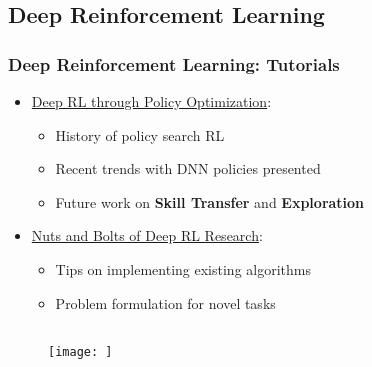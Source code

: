 \documentclass[11pt,
               hyperref={colorlinks,citecolor=pink,linkcolor=red,urlcolor=blue}
               ]{beamer}
\begin{document}
  \subsection{Deep Reinforcement Learning}

  \begin{frame}
    \frametitle{Deep Reinforcement Learning: Tutorials}

    \begin{itemize}
      \item \href{http://people.eecs.berkeley.edu/~pabbeel/nips-tutorial-policy-optimization-Schulman-Abbeel.pdf}{Deep RL through Policy Optimization\footnotemark[1]}:
        \begin{itemize}
          \item History of policy search RL
          \item Recent trends with DNN policies presented
          \item Future work on \textbf{Skill Transfer} and \textbf{Exploration}
        \end{itemize}
      \item \href{http://rll.berkeley.edu/deeprlcourse/docs/nuts-and-bolts.pdf}{Nuts and Bolts of Deep RL Research\footnotemark[2]}:
        \begin{itemize}
          \item Tips on implementing existing algorithms
          \item Problem formulation for novel tasks
        \end{itemize}
    \end{itemize}

    \begin{columns}
      \begin{column}
        \begin{figure}
          \centering
          \texttt{[image: ]}
        \end{figure}
      \end{column}
      \begin{column}
        \begin{figure}

        \end{figure}
      \end{column}
    \end{columns}
  \end{frame}
\end{document}
